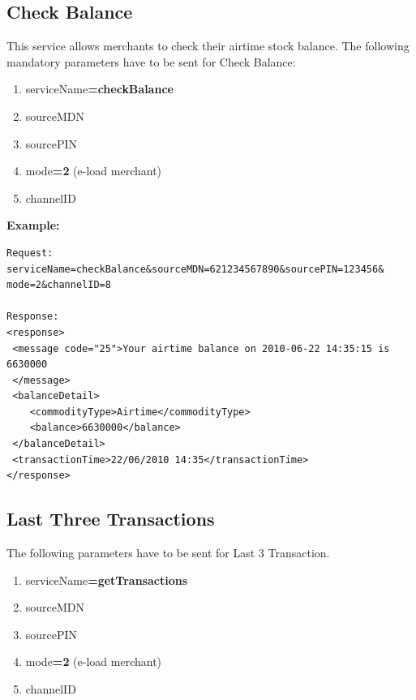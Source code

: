 \documentclass[11pt,titlepage]{article}
\begin{document}
\subsection{Check Balance}
This service allows merchants to check their airtime stock balance.
The following mandatory parameters have to be sent for Check Balance:
\begin{enumerate}
\item serviceName\textbf{=checkBalance}
\item sourceMDN
\item sourcePIN
\item mode\textbf{=2} (e-load merchant)
\item channelID
\end{enumerate}
\textbf{Example:}
\begin{verbatim}
Request:
serviceName=checkBalance&sourceMDN=621234567890&sourcePIN=123456&
mode=2&channelID=8

Response:
<response>
 <message code="25">Your airtime balance on 2010-06-22 14:35:15 is 6630000
 </message>
 <balanceDetail>
    <commodityType>Airtime</commodityType>
    <balance>6630000</balance>
 </balanceDetail>
 <transactionTime>22/06/2010 14:35</transactionTime>
</response>
\end{verbatim}

\subsection{Last Three Transactions}
The following parameters have to be sent for Last 3 Transaction.
\begin{enumerate}
\item serviceName\textbf{=getTransactions}
\item sourceMDN
\item sourcePIN
\item mode\textbf{=2} (e-load merchant)
\item channelID
\end{enumerate}
\end{document}

